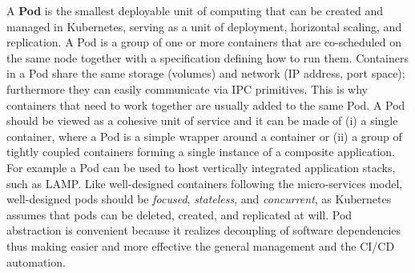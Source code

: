 A \textbf{Pod} is the smallest deployable unit of computing that can be created and managed in Kubernetes, serving as a unit of deployment, horizontal scaling, and replication.
%
A Pod is a group of one or more containers that are co-scheduled on the same node together with a specification defining how to run them.
%
Containers in a Pod share the same storage (volumes) and network (IP address, port space); furthermore they can easily communicate via IPC primitives.
%
This is why containers that need to work together are usually added to the same Pod.
%
A Pod should be viewed as a cohesive unit of service and it can be made of 
(i) a single container, where a Pod is a simple wrapper around a container or 
(ii) a group of tightly coupled containers forming a single instance of a composite application.
%
For example a Pod can be used to host vertically integrated application stacks, such as LAMP.
%
Like well-designed containers following the micro-services model, well-designed pods should be \textit{focused}, \textit{stateless}, and \textit{concurrent}, as Kubernetes assumes that pods can be deleted, created, and replicated at will.
%
Pod abstraction is convenient because it realizes decoupling of software dependencies thus making easier and more effective the general management and the CI/CD automation.
%
%
%
